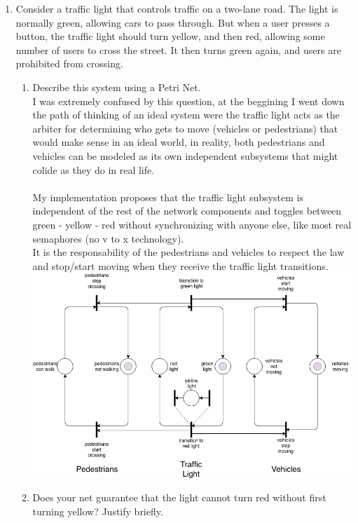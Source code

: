 \documentclass{article}
\begin{document}
\begin{enumerate}
\item Consider a traffic light that controls traffic on a two-lane road. The light is normally green, allowing cars to pass through. But when a user presses a button, the traffic light should turn yellow, and then red, allowing some number of users to cross the street. It then turns green again, and users are prohibited from crossing.
    \begin{enumerate}
    \item Describe this system using a Petri Net. \\
      I was extremely confused by this question, at the beggining I went down the path of thinking of an ideal system were the traffic light acts as the arbiter for determining who gets to move (vehicles or pedestrians) that would make sense in an ideal world, in reality, both pedestrians and vehicles can be modeled as its own independent subsystems that might colide as they do in real life. \\
      \\
      My implementation proposes that the traffic light subsystem is independent of the rest of the network components and toggles between green - yellow - red without synchronizing with anyone else, like most real semaphores (no v to x technology). \\
      It is the responsability of the pedestrians and vehicles to respect the law and stop/start moving when they receive the traffic light transitions. \\
       \includegraphics[scale=0.5]{hw13p2.png} \\
     \item Does your net guarantee that the light cannot turn red without first turning yellow? Justify briefly. \\

\end{enumerate}
\end{enumerate}
\end{document}
